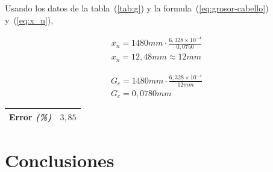 \documentclass[twocolumn, 12pt]{article}
\newcommand{\bolditalic}[1]{\textbf{\textit{#1}}}
\begin{document}
Usando los datos de la tabla~(\ref{tab:g}) y la
formula~(\ref{eq:grosor-cabello}) y~(\ref{eq:x_n}),

\begin{equation*}
      \begin{gathered}
            x_{n} = 1480 mm \cdot \frac{6,328 \times 10^{-4}}{0,0750} \\
            x_{n} = 12,48 mm \approx 12 mm
      \end{gathered}
\end{equation*}

\noindent\makebox[\linewidth]{\rule{\linewidth}{0.4pt}}

\begin{equation*}
      \begin{gathered}
            G_{c} = 1480 mm \cdot \frac{6,328 \times 10^{-4}}{12mm} \\
            G_{c} = 0,0780 mm
      \end{gathered}
\end{equation*}

\begin{table}[H]
      \begin{center}
            \begin{tabularx}{\linewidth}{|>{\centering\arraybackslash}X|>{\centering\arraybackslash}X|}
                  \hline
                  Error \bolditalic{(\%)} & $3,85$ \\\hline
            \end{tabularx}
      \end{center}
\end{table}

\section{Conclusiones}

\printbibliography
\end{document}
